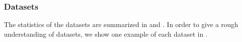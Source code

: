 \subsubsection{Datasets} 

The statistics of the datasets are summarized in 
and .
In order to give a rough understanding of datasets, we show one example of
each dataset in . 





